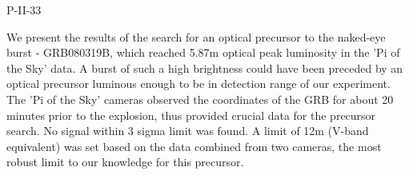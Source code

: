 P-II-33


\bigskip



\bigskip

\noindent We present the results of the search for an optical precursor to the naked-eye burst - GRB080319B, which reached 5.87m optical peak luminosity in the 'Pi of the Sky' data. A burst of such a high brightness could have been preceded by an optical precursor luminous enough to be in detection range of our experiment. The 'Pi of the Sky' cameras observed the coordinates of the GRB for about 20 minutes prior to the explosion, thus provided crucial data for the precursor search. No signal within 3 sigma limit was found. A limit of 12m (V-band equivalent) was set based on the data combined from two cameras, the most robust limit to our knowledge for this precursor.

